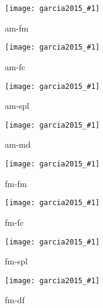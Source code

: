 \documentclass{article}
\newcommand\resultsfigure[1]{
  \begin{figure}[ht!]
    \centering
    \texttt{[image: garcia2015\_\#1]}
    \caption{#1}
  \end{figure}
}
\begin{document}

\resultsfigure{am-fm}
\resultsfigure{am-fc}
\resultsfigure{am-spl}
\resultsfigure{am-md}
\resultsfigure{fm-fm}
\resultsfigure{fm-fc}
\resultsfigure{fm-spl}
\resultsfigure{fm-df}
\end{document}
